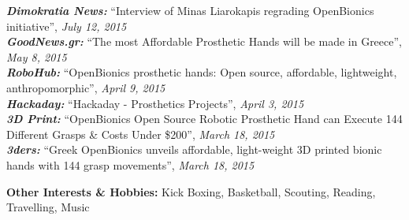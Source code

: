 \documentclass[11pt]{res} %
\begin{document}
\begin{resume}
{\it\small\textbf{Dimokratia News:}}
``Interview of Minas Liarokapis regrading OpenBionics initiative'', {\it July 12, 2015}\\
{\it\small\textbf{GoodNews.gr:}}
``The most Affordable Prosthetic Hands will be made in Greece'', {\it May 8, 2015}\\
{\it\small\textbf{RoboHub:}} %
``OpenBionics prosthetic hands: Open source, affordable, lightweight, anthropomorphic'',
{\it April 9, 2015}\\
{\it\small\textbf{Hackaday:}} %
``Hackaday - Prosthetics Projects'',
{\it April 3, 2015}\\
{\it\small\textbf{3D Print:}} %
``OpenBionics Open Source Robotic Prosthetic Hand can Execute 144 Different Grasps \& Costs Under \$200'',
{\it March 18, 2015}\\
{\it\small\textbf{3ders:}} %
``Greek OpenBionics unveils affordable, light-weight 3D printed bionic hands with 144 grasp movements'',
{\it March 18, 2015}\\

\vspace{0.2in} %

\textbf{Other Interests \& Hobbies:} Kick Boxing, Basketball, Scouting, Reading, Travelling, Music
 

\end{resume} 
\end{document}

